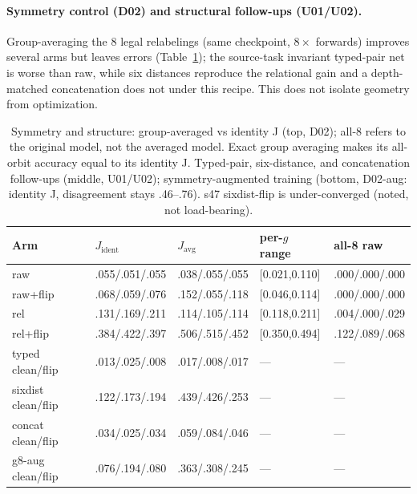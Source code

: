 \paragraph{Symmetry control (D02) and structural follow-ups (U01/U02).} Group-averaging the 8 legal relabelings (same checkpoint, $8\times$ forwards) improves several arms but leaves errors (Table~\ref{tab:d02}); the source-task invariant typed-pair net is worse than raw, while six distances reproduce the relational gain and a depth-matched concatenation does not under this recipe. This does not isolate geometry from optimization.
\begin{table}[t]
\centering
\small
\begin{tabular}{@{}lllll@{}}
\toprule
Arm & $J_{\mathrm{ident}}$ & $J_{\mathrm{avg}}$ & per-\(g\) range & all-8 raw \\
\midrule
raw & .055/.051/.055 & .038/.055/.055 & [0.021,0.110] & .000/.000/.000 \\
raw+flip & .068/.059/.076 & .152/.055/.118 & [0.046,0.114] & .000/.000/.000 \\
rel & .131/.169/.211 & .114/.105/.114 & [0.118,0.211] & .004/.000/.029 \\
rel+flip & .384/.422/.397 & .506/.515/.452 & [0.350,0.494] & .122/.089/.068 \\
typed clean/flip & .013/.025/.008 & .017/.008/.017 & --- & --- \\
sixdist clean/flip & .122/.173/.194 & .439/.426/.253 & --- & --- \\
concat clean/flip & .034/.025/.034 & .059/.084/.046 & --- & --- \\
g8-aug clean/flip & .076/.194/.080 & .363/.308/.245 & --- & --- \\
\bottomrule
\end{tabular}
\caption{Symmetry and structure: group-averaged vs identity J (top, D02); all-8 refers to the original model, not the averaged model. Exact group averaging makes its all-orbit accuracy equal to its identity J. Typed-pair, six-distance, and concatenation follow-ups (middle, U01/U02); symmetry-augmented training (bottom, D02-aug: identity J, disagreement stays .46--.76). s47 sixdist-flip is under-converged (noted, not load-bearing).}
\label{tab:d02}
\end{table}
